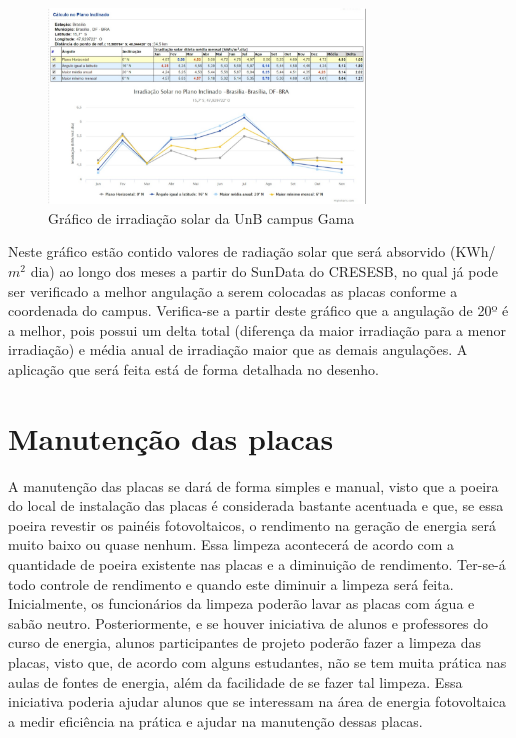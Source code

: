 \begin{figure}[!h]
\centering
\includegraphics[width=0.75\textwidth]{figuras/planoinclinado.png}
\caption{Gráfico de irradiação solar da UnB campus Gama}
\label{fig:planoinclinado}
\end{figure}

Neste gráfico estão contido valores de radiação solar que será absorvido (KWh/$m^{2}$ dia) ao longo dos meses a partir do SunData do CRESESB, no qual já pode ser verificado a melhor angulação a serem colocadas as placas conforme a coordenada do campus. Verifica-se a partir deste gráfico que a angulação de 20º é a melhor, pois possui um delta total  (diferença da maior irradiação para a menor irradiação) e média anual de irradiação maior que as demais angulações. A aplicação que será feita está de forma detalhada no desenho.

\section{Manutenção das placas}

A manutenção das placas se dará de forma simples e manual, visto que a poeira do local de instalação das placas é considerada bastante acentuada e que, se essa poeira revestir os painéis fotovoltaicos, o rendimento na geração de energia será muito baixo ou quase nenhum. Essa limpeza acontecerá de acordo com a quantidade de poeira existente nas placas e a diminuição de rendimento. Ter-se-á todo controle de rendimento e quando este diminuir a limpeza será feita. Inicialmente, os funcionários da limpeza poderão lavar as placas com água e sabão neutro. Posteriormente, e se houver iniciativa de alunos e professores do curso de energia, alunos participantes de projeto poderão fazer a limpeza das placas, visto que, de acordo com alguns estudantes, não se tem muita prática nas aulas de fontes de energia, além da facilidade de se fazer tal limpeza. Essa iniciativa poderia ajudar alunos que se interessam na área de energia fotovoltaica a medir eficiência na prática e ajudar na manutenção dessas placas.

